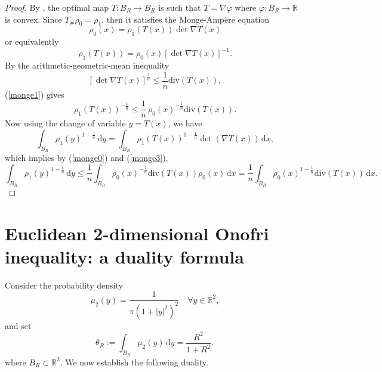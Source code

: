 \documentclass[10pt]{article}
\numberwithin{equation}{section}
\theoremstyle{plain}
\theoremstyle{definition}
\theoremstyle{remark}
\newcommand\R{{\mathbb R}}
\newcommand\dd{\,\mbox{d} }
\def\div{\mbox{div} }
\begin{document}
\begin{proof} By \cite{brenier}, the optimal map $T: B_R\rightarrow B_R$ is such that $T=\nabla\varphi$ where $\varphi: B_R\rightarrow \R$ is convex.  Since  $T_{\#}\rho_0=\rho_1$, then it satisfies the Monge-Amp\`ere equation \begin{equation}\label{monge0}
  \rho_0(x)=\rho_1(T(x)) \det {\nabla T(x)}
  \end{equation}  
 or equivalently
 \begin{equation}\label{monge1}
 \rho_1 (T(x))=\rho_0 (x) [\det {\nabla T(x)}]^{-1}.
 \end{equation}
 By the arithmetic-geometric-mean inequality
\[  [\det \nabla T(x)]^ {\frac{1}{n}}\leq \frac{1}{n} \div (T(x)),\]
 (\ref{monge1}) gives
\begin{equation}\label{monge3}
\rho_1 (T(x))^{-\frac{1}{n}}   \leq \frac{1}{n} \, \rho_0(x)^{-\frac{1}{n}} \div\left(T(x)\right).
 \end{equation}
 Now using the change of variable $y=T(x)$, we have
\[\int_{B_R} \rho_1(y) ^{1-\frac{1}{n}} \dd y  = \int_{B_R} \rho_1\left(T(x)\right) ^{1-\frac{1}{n}} \det (\nabla T(x)) \dd x, \]
which implies by (\ref{monge0}) and (\ref{monge3}), 
\[\int_{B_R} \rho_1(y) ^{1-\frac{1}{n}}  \dd y  \leq \frac{1}{n} \int_{B_R} \rho_0(x)^{-\frac{1}{n}} \div (T(x)) \rho_0 (x) \dd x = \frac{1}{n} \int_{B_R} \rho_0 (x) ^{1-\frac{1}{n}} \div (T(x)) \dd x.\]
\end{proof} 


\section{Euclidean 2-dimensional Onofri inequality: a duality formula}\label{sec2}


Consider the probability density \[\mu_2(y)=\frac{1}{\pi\left(1+|y|^2\right)^2} \quad \forall y\in\R^2,\]
 and set
\begin{equation}\label{integral theta}
\theta_R:=\int_{B_R} \mu_2(y)\dd y = \frac{R^2}{1+R^2},
\end{equation}
where $B_R\subset\R^2$. We now establish the following duality.
\end{document}
